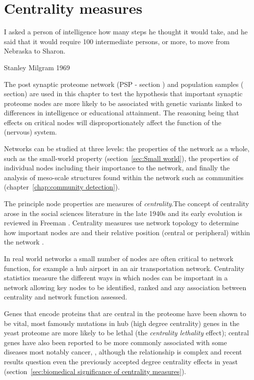 \chapter{Centrality measures}
\label{chap:Centrality measures}



 \begin{displayquote}
 I asked a person of intelligence how many steps he thought it would take, and he said that it would require 100 intermediate persons, or more, to move from Nebraska to Sharon. \cite{milgram1967small}
 
 Stanley Milgram 1969
\end{displayquote}



The post synaptic proteome network (PSP - section ) and population samples ( section) are used in this chapter to test the hypothesis that important synaptic proteome nodes are more likely to be associated with genetic variants linked to differences in intelligence or educational attainment. The reasoning being that effects on critical nodes will disproportionately affect the function of the (nervous) system. 

Networks can be studied at three levels: the properties of the network as a whole, such as the small-world property (section~\ref{sec:Small world}), the properties of individual nodes including their importance to the network, and finally the analysis of meso-scale structures found within the network such as communities (chapter~\ref{chap:community detection}).
  
  The principle node properties are measures of \textit{centrality}.The concept of centrality arose in the social sciences literature in the late 1940s and its early evolution is reviewed in Freeman \cite{freeman1978centrality}. Centrality measures use network topology to determine how important nodes are\cite{newman2018networks} and their relative position (central or peripheral) within the network \cite{freeman1978centrality}.

 In real world networks a small number of nodes are often critical to network function, for example a hub airport in an air transportation network\cite{borenstein1989hubs}. Centrality statistics measure the different ways in which nodes can be important in a network allowing key nodes to be identified, ranked and any association between centrality and network function assessed. 
 
Genes that encode proteins that are central in the proteome have been shown to be vital, most famously mutations in hub (high degree centrality) genes in the yeast proteome are more likely to be lethal (the \textit{centrality lethality} effect)\cite{jeong2001lethality}; central genes have also been reported to be more commonly associated with some diseases most notably cancer\cite{vogelstein2000surfing}, \cite{albert2005scale},\cite{xu2006discovering} although the relationship is complex and recent results question even the previously accepted degree centrality effects in yeast (section~\ref{sec:biomedical significance of centrality measures}).

